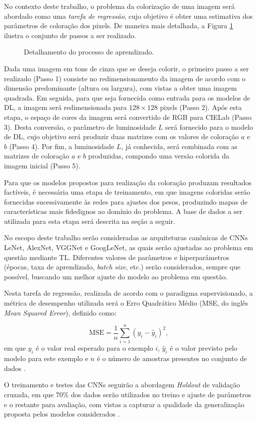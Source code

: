 No contexto deste trabalho, o problema da colorização de uma imagem será abordado como uma \emph{tarefa de regressão}, cujo objetivo é obter uma estimativa dos parâmetros de coloração dos pixels. De maneira mais detalhada, a Figura \ref{fig:aprendizado} ilustra o conjunto de passos a ser realizado.

\begin{figure}[h]
	\centering
	\caption{Detalhamento do processo de aprendizado.}
	\label{fig:aprendizado}
\end{figure}

Dada uma imagem em tons de cinza que se deseja colorir, o primeiro passo a ser realizado (Passo 1) consiste no redimensionamento da imagem de acordo com o dimensão predominante (altura ou largura), com vistas a obter uma imagem quadrada. Em seguida, para que seja fornecida como entrada para os modelos de DL, a imagem será redimensionada para $128 \times 128$ pixels (Passo 2). Após esta etapa, o espaço de cores da imagem será convertido de RGB para CIELab (Passo 3). Desta conversão, o parâmetro de luminosidade $L$ será fornecido para o modelo de DL, cujo objetivo será produzir duas matrizes com os valores de coloração $a$ e $b$ (Passo 4). Por fim, a luminosidade $L$, já conhecida, será combinada com as matrizes de coloração $a$ e $b$ produzidas, compondo uma versão colorida da imagem inicial (Passo 5).

Para que os modelos propostos para realização da coloração produzam resultados factíveis, é necessária uma etapa de treinamento, em que imagens coloridas serão fornecidas sucessivamente às redes para ajustes dos pesos, produzindo mapas de características mais fidedignos ao domínio do problema. A base de dados a ser utilizada para esta etapa será descrita na seção a seguir.

No escopo deste trabalho serão consideradas as arquiteturas canônicas de CNNs LeNet, AlexNet, VGGNet e GoogLeNet, as quais serão ajustadas ao problema em questão mediante TL. Diferentes valores de parâmetros e hiperparâmetros (épocas, taxa de aprendizado, \emph{batch size}, etc.) serão considerados, sempre que possível, buscando um melhor ajuste do modelo ao problema em questão.

Nesta tarefa de regressão, realizada de acordo com o paradigma supervisionado, a métrica de desempenho utilizada será o Erro Quadrático Médio (MSE, do inglês \emph{Mean Squared Error}), definido como:

\begin{equation}
\textrm{MSE} = \frac{1}{n}\sum_{i=1}^n (y_i - \hat{y}_i)^{2}, \label{eq:mse}
\end{equation} em que $y_i$ é o valor real esperado para o exemplo $i$, $\hat{y}_i$ é o valor previsto pelo modelo para este exemplo e $n$ é o número de amostras presentes no conjunto de dados \cite{ref:faceli}.

O treinamento e testes das CNNs seguirão a abordagem \emph{Holdout} de validação cruzada, em que $70\%$ dos dados serão utilizados no treino e ajuste de parâmetros e o restante para avaliação, com vistas a capturar a qualidade da generalização proposta pelos modelos considerados \cite{Brink:MachineLearningLivro}.
